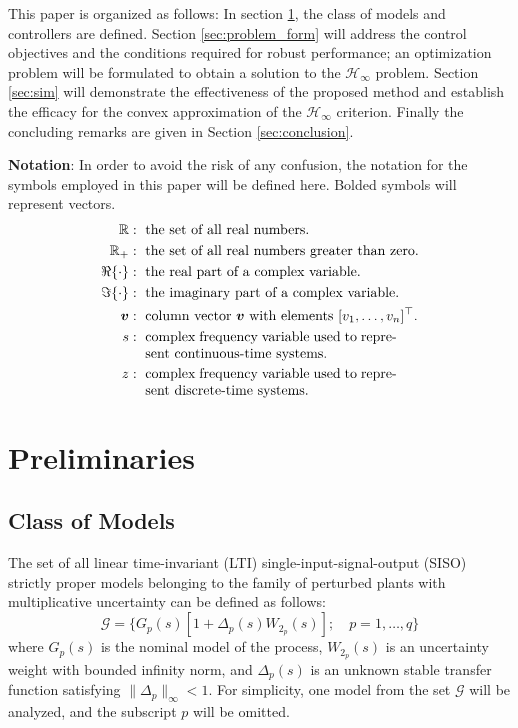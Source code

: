 \documentclass[letterpaper, 10 pt, conference]{ieeeconf}  %
\begin{document}
This paper is organized as follows: In section \ref{sec:pre}, the class of models and controllers are defined. Section \ref{sec:problem_form} will address the control objectives and the conditions required for robust performance; an optimization problem will be formulated to obtain a solution to the $\mathcal{H}_{\infty}$ problem. Section \ref{sec:sim} will demonstrate the effectiveness of the proposed method and establish the efficacy for the convex approximation of the $\mathcal{H}_{\infty}$ criterion. Finally the concluding remarks are given in Section \ref{sec:conclusion}.

\textbf{Notation}: In order to avoid the risk of any confusion, the notation for the symbols employed in this paper will be defined here. Bolded symbols will represent vectors.
\begin{align*}
\mathbb{R} &: \ \mbox{the set of all real numbers.} \\
\mathbb{R}_+ &: \ \mbox{the set of all real numbers greater than zero.} \\
\Re\{\cdot \} &: \ \mbox{the real part of a complex variable.} \\
\Im\{\cdot \} &: \ \mbox{the imaginary part of a complex variable.} \\
\bm{v} &: \ \mbox{column vector }\bm{v} \mbox{ with elements }[v_1,\ldots,v_n]^{\top}. \\
s &: \ \parbox[t]{18em}{complex frequency variable used to represent continuous-time systems.} \\
z &: \ \parbox[t]{18em}{complex frequency variable used to represent discrete-time systems.}
\end{align*} 

\section{Preliminaries} \label{sec:pre}
\subsection{Class of Models}
The set of all linear time-invariant (LTI) single-input-signal-output (SISO) strictly proper models belonging to the family of perturbed plants with multiplicative uncertainty can be defined as follows:
\begin{equation}\label{eq:uncert_set}
\mathcal{G} = \{ G_p(s)[1+\Delta_p(s) W_{2_{p}}(s)]; \quad p=1,\ldots,q\}
\end{equation}  
where $G_p(s)$ is the nominal model of the process, $W_{2_{p}}(s)$ is an uncertainty weight with bounded infinity norm, and $\Delta_p(s)$ is an unknown stable transfer function satisfying $\| \Delta_p \|_{\infty}<1$. For simplicity, one model from the set $\mathcal{G}$ will be analyzed, and the subscript $p$ will be omitted. 
\end{document}
